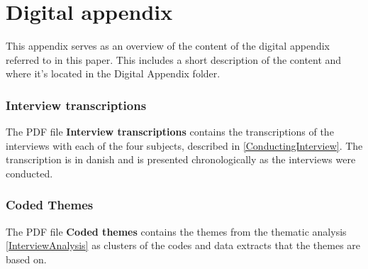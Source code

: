 \chapter{Digital appendix}
\label{DigitalAppendix}
%
This appendix serves as an overview of the content of the digital appendix referred to in this paper. This includes a short description of the content and where it's located in the Digital Appendix folder. 

\subsection*{Interview transcriptions}
%
The PDF file \textbf{Interview transcriptions} contains the transcriptions of the interviews with each of the four subjects, described in \autoref{ConductingInterview}. The transcription is in danish and is presented chronologically as the interviews were conducted.

\subsection*{Coded Themes}
% 
The PDF file \textbf{Coded themes} contains the themes from the thematic analysis \autoref{InterviewAnalysis} as clusters of the codes and data extracts that the themes are based on. 